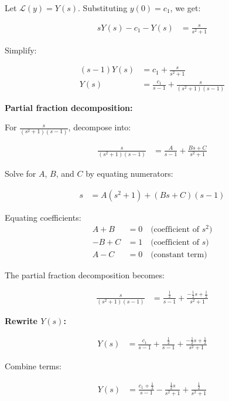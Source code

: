 \documentclass[journal]{IEEEtran}
\begin{document}
	Let $\mathcal{L}(y) = Y(s)$. Substituting $y(0) = c_1$, we get:
	
	\begin{align}
		sY(s) - c_1 - Y(s) &= \frac{s}{s^2 + 1}
	\end{align}
	
	Simplify:
	
	\begin{align}
		(s - 1)Y(s) &= c_1 + \frac{s}{s^2 + 1} \\
		Y(s) &= \frac{c_1}{s - 1} + \frac{s}{(s^2 + 1)(s - 1)}
	\end{align}
	
	\textbf{Partial fraction decomposition:}
	
	For $\frac{s}{(s^2 + 1)(s - 1)}$, decompose into:
	
	\begin{align}
		\frac{s}{(s^2 + 1)(s - 1)} &= \frac{A}{s - 1} + \frac{Bs + C}{s^2 + 1}
	\end{align}
	
	Solve for $A$, $B$, and $C$ by equating numerators:
	
	\begin{align}
		s &= A(s^2 + 1) + (Bs + C)(s - 1)
	\end{align}
	
	
	
	Equating coefficients:
	\begin{align}
		A + B &= 0 \quad \text{(coefficient of $s^2$)} \\
		-B + C &= 1 \quad \text{(coefficient of $s$)} \\
		A - C &= 0 \quad \text{(constant term)}
	\end{align}
	
	
	The partial fraction decomposition becomes:
	
	\begin{align}
		\frac{s}{(s^2 + 1)(s - 1)} &= \frac{\frac{1}{2}}{s - 1} + \frac{-\frac{1}{2}s + \frac{1}{2}}{s^2 + 1}
	\end{align}
	
	\textbf{Rewrite $Y(s)$:}
	
	\begin{align}
		Y(s) &= \frac{c_1}{s - 1} + \frac{\frac{1}{2}}{s - 1} + \frac{-\frac{1}{2}s + \frac{1}{2}}{s^2 + 1}
	\end{align}
	
	Combine terms:
	
	\begin{align}
		Y(s) &= \frac{c_1 + \frac{1}{2}}{s - 1} - \frac{\frac{1}{2}s}{s^2 + 1} + \frac{\frac{1}{2}}{s^2 + 1}
	\end{align}
	
\end{document}
